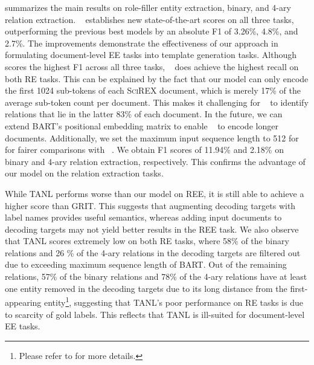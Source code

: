 \documentclass[11pt]{article}
\begin{document}
\label{sec:main_results}
 summarizes the main results on role-filler entity extraction, binary, and 4-ary relation extraction. \modelshort~ establishes new state-of-the-art scores on all three tasks, outperforming the previous best models by an absolute F1 of 3.26\%, 4.8\%, and  2.7\%. The improvements demonstrate the effectiveness of our approach in formulating document-level EE tasks into template generation tasks. Although \modelshort~ scores the highest F1 across all three tasks, \scirexpipeline~ does achieve the highest recall on both RE tasks. This can be explained by the fact that our model can only encode the first 1024 sub-tokens of each \textsc{SciREX} document, which is merely 17\% of the average sub-token count per document. This makes it challenging for \modelshort~ to identify relations that lie in the latter 83\% of each document. In the future, we can extend \textsc{BART}'s positional embedding matrix to enable \modelshort~ to encode longer documents. Additionally, we set the maximum input sequence length to 512 for \modelshort~ for fairer comparisons with \scirexpipeline~. We obtain F1 scores of 11.94\%
and 2.18\% on binary and 4-ary relation extraction, respectively. This confirms the advantage of our model on the relation extraction tasks.


While TANL performs worse than our model on REE, it is still able to achieve a higher score than GRIT. This suggests that augmenting decoding targets with label names provides useful semantics, whereas adding input documents to decoding targets may not yield better results in the REE task. We also observe that TANL scores extremely low on both RE tasks, where 58\% of the binary relations and 26 \% of the 4-ary relations in the decoding targets are filtered out due to exceeding maximum sequence length of \textsc{BART}. Out of the remaining relations, 57\% of the binary relations and 78\% of the 4-ary relations have at least one entity removed in the decoding targets due to its long distance from the first-appearing entity\footnote{Please refer to  for more details.}, suggesting that TANL's poor performance on RE tasks is due to scarcity of gold labels. This reflects that TANL is ill-suited for document-level EE tasks.




        
        
\end{document}
